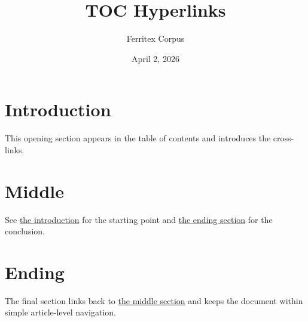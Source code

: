 \documentclass{article}
\title{TOC Hyperlinks}
\author{Ferritex Corpus}
\date{April 2, 2026}
\begin{document}
\maketitle
\tableofcontents

\section{Introduction}
\label{sec:introduction}
This opening section appears in the table of contents and introduces the cross-links.

\section{Middle}
\label{sec:middle}
See \hyperref[sec:introduction]{the introduction} for the starting point and
\hyperref[sec:ending]{the ending section} for the conclusion.

\section{Ending}
\label{sec:ending}
The final section links back to \hyperref[sec:middle]{the middle section} and keeps
the document within simple article-level navigation.
\end{document}
